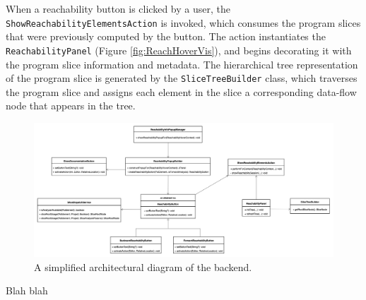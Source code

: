 \par When a reachability button is clicked by a user, the 
\texttt{ShowReachabilityElementsAction} is invoked, which consumes the program
slices that were previously computed by the button.
The action instantiates the \texttt{ReachabilityPanel}
(Figure \ref{fig:ReachHoverVis}), and begins decorating it with the program
slice information and metadata.
The hierarchical tree representation of the program slice is generated by the
\texttt{SliceTreeBuilder} class, which traverses the program slice and assigns
each element in the slice a corresponding data-flow node that appears in the
tree.

\begin{landscape}
\begin{figure}[ht]
\centering
\includegraphics[scale=0.35]{./figs/reach-hover-backend.png}
\caption{
  A simplified architectural diagram of the \toolname{} backend.
}
\label{fig:ReachHoverBackend}
\end{figure}
\end{landscape}

Blah blah


\endinput
